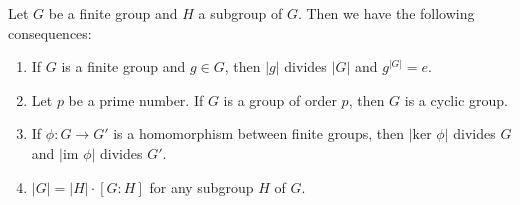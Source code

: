     \begin{corollary}
        Let $G$ be a finite group and $H$ a subgroup of $G$. Then we
        have the following consequences: 
        \begin{enumerate}
            \item If $G$ is a finite group and $g \in G$, then $|g|$
            divides $|G|$ and $g^{|G|} = e$.

            \item Let $p$ be a prime number. 
            If $G$ is a group of order $p$, then $G$ is a cyclic
            group.
            
            \item If $ \phi :G \to G'$ is a homomorphism between finite
            groups, then $|\mbox{ker } \phi|$ divides $G$ and
            $|\mbox{im }\phi|$ divides $G'$.

            \item $|G| = |H|\cdot[G:H]$ for any subgroup $H$ of $G$.
        \end{enumerate}
    \end{corollary}

